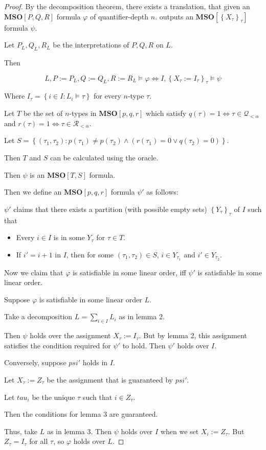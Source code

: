 \documentclass{article}
\newcommand{\braces}[1]{\left\{ {#1} \right\}}
\newcommand{\setcomp}[1]{\braces{#1}}
\newcommand{\mso}{\mathbf{MSO}}
\begin{document}
\begin{proof}
  By the decomposition theorem, there exists a translation,
  that given an $\mso[P, Q, R]$ formula $\varphi$ of quantifier-depth $n$.
  outputs an $\mso[\setcomp{X_\tau}_\tau]$ formula $\psi$.

  Let $P_L, Q_L, R_L$ be the interpretations of $P, Q, R$ on $L$.

  Then

  $$
    L, P := P_L, Q := Q_L, R := R_L \models \varphi \iff I, \setcomp{X_\tau := I_\tau}_\tau \models \psi
  $$

  Where $I_\tau = \setcomp{i \in I : L_i \models \tau}$ for every $n$-type $\tau$.

  Let $T$ be the set of $n$-types in $\mso[p, q, r]$ which satisfy
  $q(\tau) = 1 \iff \tau \in \mathcal{Q}_{< \alpha}$ and $r(\tau) = 1 \iff \tau \in \mathcal{R}_{< \alpha}$.

  Let $S = \setcomp{(\tau_1, \tau_2) : p(\tau_1) \ne p(\tau_2) \land (r(\tau_1) = 0 \lor q(\tau_2) = 0)}$.

  Then $T$ and $S$ can be calculated using the oracle.

  Then $\psi$ is an $\mso[T, S]$ formula.

  Then we define an $\mso[p, q, r]$ formula $\psi'$ as follows:

  $\psi'$ claims that there exists a partition (with possible empty sets) $\setcomp{Y_\tau}_{\tau}$ of $I$ such that
  \begin{itemize}
    \item Every $i \in I$ is in some $Y_\tau$ for $\tau \in T$.
    \item If $i' = i+1$ in $I$, then for some $(\tau_1, \tau_2) \in S$, $i \in Y_{\tau_1}$ and $i' \in Y_{\tau_2}$.
  \end{itemize}

  Now we claim that $\varphi$ is satisfiable in some linear order, iff $\psi'$ is satisfiable in some
  linear order.
  
  Suppose $\varphi$ is satisfiable in some linear order $L$.

  Take a decomposition $L = \sum_{i \in I} L_i$ as in lemma 2.

  Then $\psi$ holds over the assignment $X_\tau := I_\tau$. But by lemma 2, this assignment
  satisfies the condition required for $\psi'$ to hold. Then $\psi'$ holds over $I$.

  Conversely, suppose $psi'$ holds in $I$.

  Let $X_\tau := Z_\tau$ be the assignment that is guaranteed by $psi'$.

  Let $tau_i$ be the unique $\tau$ such that $i \in Z_\tau$.

  Then the conditions for lemma 3 are guaranteed.

  Thus, take $L$ as in lemma 3. Then $\psi$ holds over $I$ when we set $X_i := Z_\tau$.
  But $Z_\tau = I_\tau$ for all $\tau$, so $\varphi$ holds over $L$.
\end{proof}
\end{document}
